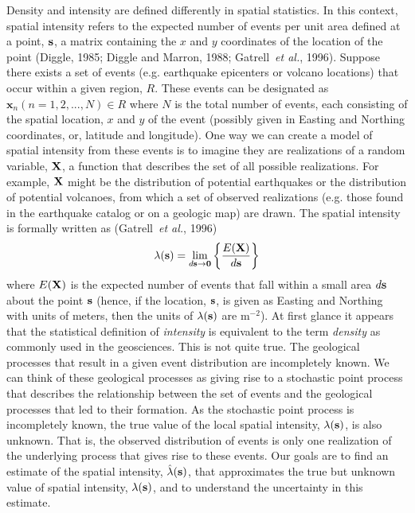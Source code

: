 \documentclass[10pt]{article}
\begin{document}
Density and intensity are defined differently in spatial statistics. In this context, spatial intensity refers to the expected number of events per unit area defined at a point, $\bf{s}$, a matrix containing the $x$ and $y$ coordinates of the location of the point (Diggle, 1985; Diggle and Marron, 1988; Gatrell~{\it et al.}, 1996). Suppose there exists a set of events (e.g. earthquake epicenters or volcano locations) that occur within a given region, $R$. These events can be designated as ${\mathbf{x}_n (n=1, 2,...,N)}\in R$ where $N$ is the total number of events, each consisting of the spatial location, $x$ and $y$ of the event (possibly given in Easting and Northing coordinates, or, latitude and longitude). One way we can create a model of spatial intensity from these events is to imagine they are realizations of a random variable, $\bf{X}$, a  function that describes the set of all possible realizations. For example, $\bf{X}$ might be the distribution of potential earthquakes or the distribution of potential volcanoes, from which a set of observed realizations (e.g. those found in the earthquake catalog or on a geologic map) are drawn. The spatial intensity is formally written as (Gatrell~{\it et al.}, 1996)
\begin{equation}
\lambda (\mathbf{s}) = \lim_{d\bf{s} \to 0} \left\{ \frac{E(\bf{X})}{d\bf{s}} \right\}
\label{eq14-1}
\end{equation}
where $E(\bf{X})$  is the expected number of events that fall within a small area $d\bf{s}$ about the point $\bf{s}$ (hence, if the location, $\bf{s}$, is given as Easting and Northing with units of meters, then the units of $\lambda(\bf{s})$ are m$^{-2}$). At first glance it appears that the statistical definition of {\it intensity} is equivalent to the term {\it density} as commonly used in the geosciences. This is not quite true. The geological processes that result in a given event distribution are incompletely known. We can think of these geological processes as giving rise to a stochastic point process that describes the relationship between the set of events and the geological processes that led to their formation. As the stochastic point process is incompletely known, the true value of the local spatial intensity, $\lambda(\bf{s})$, is also unknown. That is, the observed distribution of events is only one realization of the underlying process that gives rise to these events. Our goals are to find an estimate of the spatial intensity, $\hat\lambda(\bf{s})$, that approximates the true but unknown value of spatial intensity, $\lambda(\bf{s})$, and to understand the uncertainty in this estimate.
\end{document}
